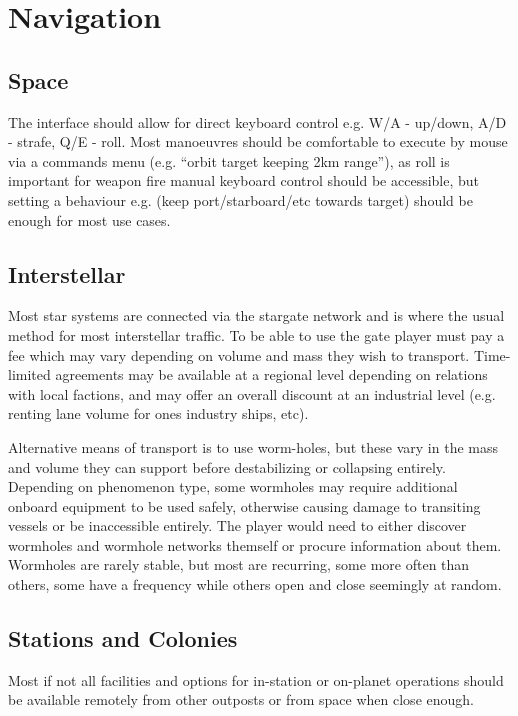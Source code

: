\documentclass[a4paper,10pt]{article}
\begin{document}
\section{Navigation}
\begin{multicols}{2}

\subsection{Space}
The interface should allow for direct keyboard control e.g. W/A - up/down, A/D
- strafe, Q/E - roll. Most manoeuvres should be comfortable to execute by mouse
via a commands menu (e.g. ``orbit target keeping 2km range''), as roll is
important for weapon fire manual keyboard control should be accessible, but
setting a behaviour e.g. (keep port/starboard/etc towards target) should be
enough for most use cases.

\subsection{Interstellar}
Most star systems are connected via the stargate network and is where the
usual method for most interstellar traffic. To be able to use the gate player
must pay a fee which may vary depending on volume and mass they wish to
transport. Time-limited agreements may be available at a regional level
depending on relations with local factions, and may offer an overall discount
at an industrial level (e.g. renting lane volume for ones industry ships, etc).

Alternative means of transport is to use worm-holes, but these vary in the mass
and volume they can support before destabilizing or collapsing entirely.
Depending on phenomenon type, some wormholes may require additional onboard
equipment to be used safely, otherwise causing damage to transiting vessels or
be inaccessible entirely. The player would need to either discover wormholes
and wormhole networks themself or procure information about them. Wormholes are
rarely stable, but most are recurring, some more often than others, some have a
frequency while others open and close seemingly at random.

\subsection{Stations and Colonies}
Most if not all facilities and options for in-station or on-planet operations
should be available remotely from other outposts or from space when close
enough.


\end{multicols}
\end{document}
